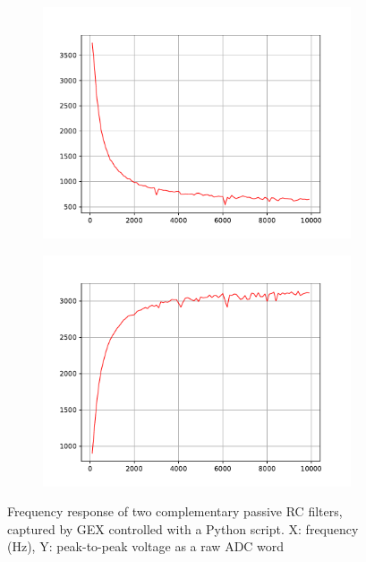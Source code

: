 \begin{figure}
	\centering
	\begin{subfigure}{.5\textwidth}
		\centering
		\includegraphics[width=\linewidth]{img/filter1.pdf}
	\end{subfigure}%
	\begin{subfigure}{.5\textwidth}
		\centering
		\includegraphics[width=\linewidth]{img/filter2.pdf}
	\end{subfigure}
	\caption[RC filter frequency responses]{Frequency response of two complementary passive RC filters, captured by GEX controlled with a Python script. X: frequency (Hz), Y: peak-to-peak voltage as a raw ADC word }
	\label{fig:demofilter_cap}
\end{figure}

